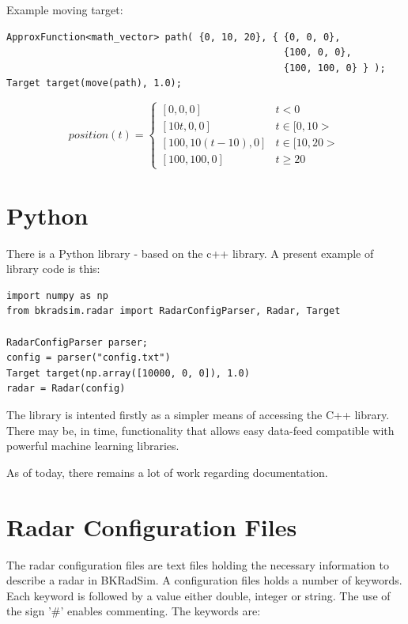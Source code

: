 \documentclass[letterpaper]{book}
\begin{document}
Example moving target:
\begin{lstlisting}
ApproxFunction<math_vector> path( {0, 10, 20}, { {0, 0, 0}, 
                                                 {100, 0, 0},
                                                 {100, 100, 0} } );
Target target(move(path), 1.0);
\end{lstlisting}
\begin{equation}
position(t) = \begin{cases} 
                 [0, 0, 0] & t < 0 \\
                 [10t, 0, 0] & t \in [0, 10> \\
                 [100, 10(t-10), 0] & t \in [10, 20>  \\
                 [100, 100, 0] & t \geq 20
              \end{cases}
\end{equation}


\chapter{Python}
There is a Python library - based on the c++ library. A present example of library code is this:
\begin{lstlisting}
import numpy as np
from bkradsim.radar import RadarConfigParser, Radar, Target

RadarConfigParser parser;
config = parser("config.txt")
Target target(np.array([10000, 0, 0]), 1.0)
radar = Radar(config)
\end{lstlisting}

The library is intented firstly as a simpler means of accessing the C++ library. There may be, in time, functionality that allows easy data-feed compatible with powerful machine learning libraries.

As of today, there remains a lot of work regarding documentation.


\chapter{Radar Configuration Files}
\label{chap:configfile}
The radar configuration files are text files holding the necessary information to describe a radar in BKRadSim. A configuration files holds a number of keywords. Each keyword is followed by a value either double, integer or string. The use of the sign '\#' enables commenting. The keywords are:
\end{document}
